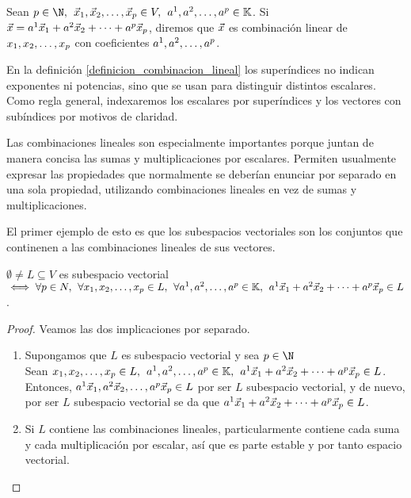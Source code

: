 \documentclass[../algebra_lineal.tex]{subfiles}
\begin{document}
\begin{definition}
    \label{definicion_combinacion_lineal}
    Sean $p \in \N, \spc \dlst{\vx}{p} \in V, \spc \ulst{a}{p} \in \K$. Si $\vec{x} = {a}^{1}\vec{x}_{1}+{a}^{2}\vec{x}_{2}+\dots+{a}^{p}\vec{x}_{p}$, diremos que $\vec{x}$ es combinación linear de ${x}_{1}, {x}_{2}, \dots, {x}_{p}$ con coeficientes ${a}^{1}, {a}^{2}, \dots, {a}^{p}$.

\end{definition}

\begin{remark}
    En la definición \ref{definicion_combinacion_lineal} los superíndices no indican exponentes ni potencias, sino que se usan para distinguir distintos escalares. Como regla general, indexaremos los escalares por superíndices y los vectores con subíndices por motivos de claridad.
\end{remark}

Las combinaciones lineales son especialmente importantes porque juntan de manera concisa las sumas y multiplicaciones por escalares. Permiten usualmente expresar las propiedades que normalmente se deberían enunciar por separado en una sola propiedad, utilizando combinaciones lineales en vez de sumas y multiplicaciones. 

El primer ejemplo de esto es que los subespacios vectoriales son los conjuntos que continenen a las combinaciones lineales de sus vectores.


\begin{proposition}
    $\emptyset \ne L \subseteq V$ es subespacio vectorial $\iff \forall p \in N, \hspace{1.5mm} \forall {x}_{1}, {x}_{2}, \dots, {x}_{p} \in L, \hspace{1.5mm} \forall {a}^{1}, {a}^{2}, \dots, {a}^{p} \in \mathbb{K}, \hspace{1.5mm} {a}^{1}\vec{x}_{1}+{a}^{2}\vec{x}_{2}+\dots+{a}^{p}\vec{x}_{p} \in L$.
\end{proposition}

\begin{proof}
    Veamos las dos implicaciones por separado.
    \begin{enumerate}
        \item[\protect\fbox{$\Rightarrow$}] Supongamos que $L$ es subespacio vectorial y sea $p \in \N$ \\
        Sean ${x}_{1}, {x}_{2}, \dots, {x}_{p} \in L, \hspace{1.5mm} {a}^{1}, {a}^{2}, \dots, {a}^{p} \in \mathbb{K}, \hspace{1.5mm} {a}^{1}\vec{x}_{1}+{a}^{2}\vec{x}_{2}+\dots+{a}^{p}\vec{x}_{p} \in L$. Entonces, $a^1 \vec{x}_1, a^2\vec{x}_2, \dots, a^p\vec{x}_p \in L$ por ser $L$ subespacio vectorial, y de nuevo, por ser $L$ subespacio vectorial se da que ${a}^{1}\vec{x}_{1}+{a}^{2}\vec{x}_{2}+\dots+{a}^{p}\vec{x}_{p} \in L$. 
        \item[\protect\fbox{$\Leftarrow$}] Si $L$ contiene las combinaciones lineales, particularmente contiene cada suma y cada multiplicación por escalar, así que es parte estable y por tanto espacio vectorial.
    \end{enumerate} 
\end{proof}
\end{document}
